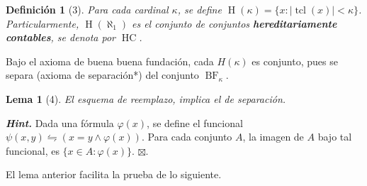 \documentclass[letterpaper,DIV=15,12pt]{scrartcl}
\theoremstyle{manual}
\newtheorem{definicion}{Definición}
\newtheorem{lema}{Lema}
\newcommand{\tq}{:}
\begin{document}
    \begin{definicion}[3]\itshape
        Para cada cardinal $\kappa$, se define $\operatorname*{H}(\kappa)=\{ x \tq |\operatorname*{tcl}(x)| < \kappa  \}$. Particularmente, $\operatorname*{H}(\aleph_1)$ es el conjunto de conjuntos \textbf{hereditariamente contables}, se denota por $\operatorname*{HC}$.
    \end{definicion}

    Bajo el axioma de buena buena fundación, cada $H(\kappa)$ es conjunto, pues se separa (axioma de separación*) del conjunto $\operatorname*{BF}_\kappa$.

    \begin{lema}[4]
        El esquema de reemplazo, implica el de separación.
    \end{lema}
    \textit{\bfseries Hint.} Dada una fórmula $\varphi(x)$, se define el funcional $\psi(x,y) \leftrightharpoons (x=y \land \varphi(x))$. Para cada conjunto $A$, la imagen de $A$ bajo tal funcional, es $\{x \in A \tq \varphi(x)\}$. \hfill $\boxtimes$.

    El lema anterior facilita la prueba de lo siguiente.
\end{document}
